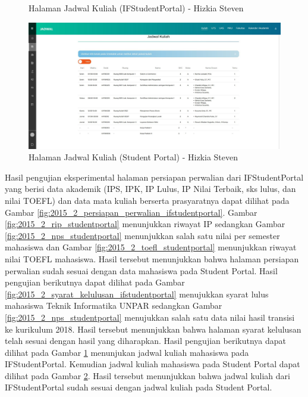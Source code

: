 \begin{itemize}
\begin{enumerate}
\begin{figure}[H]
			\caption{Halaman Jadwal Kuliah (IFStudentPortal) - Hizkia Steven}
			\label{fig:2015_2_jadwal_kuliah_ifstudentportal}
		\end{figure}
		\begin{figure}[H]
			\centering
			\includegraphics[scale=0.3]{Gambar/HasilPengujian/2015_2_jadwal_kuliah_studentportal}
			\caption{Halaman Jadwal Kuliah (Student Portal) - Hizkia Steven}
			\label{fig:2015_2_jadwal_kuliah_studentportal}
		\end{figure}
		Hasil pengujian eksperimental halaman persiapan perwalian dari IFStudentPortal yang berisi data akademik (IPS, IPK, IP Lulus, IP Nilai Terbaik, sks lulus, dan nilai TOEFL) dan data mata kuliah berserta prasyaratnya dapat dilihat pada Gambar \ref{fig:2015_2_persiapan_perwalian_ifstudentportal}. Gambar \ref{fig:2015_2_rip_studentportal} menunjukkan riwayat IP sedangkan Gambar \ref{fig:2015_2_nps_studentportal} menunjukkan salah satu nilai per semester mahasiswa dan Gambar \ref{fig:2015_2_toefl_studentportal} menunjukkan riwayat nilai TOEFL mahasiswa. Hasil tersebut menunjukkan bahwa halaman persiapan perwalian sudah sesuai dengan data mahasiswa pada Student Portal. Hasil pengujian berikutnya dapat dilihat pada Gambar \ref{fig:2015_2_syarat_kelulusan_ifstudentportal} menujukkan syarat lulus mahasiswa Teknik Informatika UNPAR sedangkan Gambar \ref{fig:2015_2_nps_studentportal} menujukkan salah satu data nilai hasil transisi ke kurikulum 2018. Hasil tersebut menunjukkan bahwa halaman syarat kelulusan telah sesuai dengan hasil yang diharapkan. Hasil pengujian berikutnya dapat dilihat pada Gambar \ref{fig:2015_2_jadwal_kuliah_ifstudentportal} menunjukan jadwal kuliah mahasiswa pada IFStudentPortal. Kemudian jadwal kuliah mahasiswa pada Student Portal dapat dilihat pada Gambar \ref{fig:2015_2_jadwal_kuliah_studentportal}. Hasil tersebut menunjukkan bahwa jadwal kuliah dari IFStudentPortal sudah sesuai dengan jadwal kuliah pada Student Portal.

\end{enumerate}
\end{itemize}
